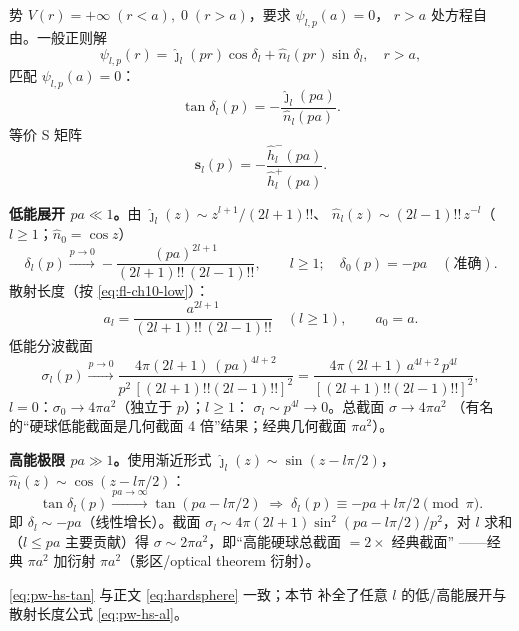 势 $V(r)=+\infty\;(r<a),\;0\;(r>a)$，要求 $\psi_{l,p}(a)=0$，
$r>a$ 处方程自由。一般正则解
\[
\psi_{l,p}(r)=\hat\jmath_l(pr)\cos\delta_l+\hat n_l(pr)\sin\delta_l,
\quad r>a,
\]
匹配 $\psi_{l,p}(a)=0$：
\begin{equation}\label{eq:pw-hs-tan}
\boxed{\;\tan\delta_l(p)=-\frac{\hat\jmath_l(pa)}{\hat n_l(pa)}.\;}
\end{equation}
等价 S 矩阵
\begin{equation}\label{eq:pw-hs-S}
\mathbf s_l(p)=-\frac{\hat h_l^-(pa)}{\hat h_l^+(pa)}.
\end{equation}

\textbf{低能展开 $pa\ll 1$。}由 $\hat\jmath_l(z)\sim z^{l+1}/(2l+1)!!$、
$\hat n_l(z)\sim (2l-1)!!\,z^{-l}$（$l\ge 1$；$\hat n_0=\cos z$）
\begin{equation}\label{eq:pw-hs-low}
\delta_l(p)\xrightarrow{p\to 0}
-\frac{(pa)^{2l+1}}{(2l+1)!!\,(2l-1)!!},\qquad l\ge 1;
\quad
\delta_0(p)= -pa\quad(\text{准确}).
\end{equation}
散射长度（按 \eqref{eq:fl-ch10-low}）：
\begin{equation}\label{eq:pw-hs-al}
a_l=\frac{a^{2l+1}}{(2l+1)!!\,(2l-1)!!}\quad(l\ge 1),\qquad
a_0=a.
\end{equation}
低能分波截面
\[
\sigma_l(p)\xrightarrow{p\to 0}\frac{4\pi(2l+1)\,(pa)^{4l+2}}
   {p^2\,[(2l+1)!!(2l-1)!!]^2}
=\frac{4\pi(2l+1)\,a^{4l+2}\,p^{4l}}{[(2l+1)!!(2l-1)!!]^2},
\]
$l=0$：$\sigma_0\to 4\pi a^2$（独立于 $p$）；$l\ge 1$：
$\sigma_l\sim p^{4l}\to 0$。总截面 $\sigma\to 4\pi a^2$
（有名的“硬球低能截面是几何截面 4 倍”结果；经典几何截面
$\pi a^2$）。

\textbf{高能极限 $pa\gg 1$。}使用渐近形式
$\hat\jmath_l(z)\sim\sin(z-l\pi/2)$，
$\hat n_l(z)\sim\cos(z-l\pi/2)$：
\begin{equation}
\tan\delta_l(p)\xrightarrow{pa\to\infty}\tan(pa-l\pi/2)
\;\Rightarrow\; \delta_l(p)\equiv -pa+l\pi/2\pmod\pi.
\end{equation}
即 $\delta_l\sim -pa$（线性增长）。截面
$\sigma_l\sim 4\pi(2l+1)\sin^2(pa-l\pi/2)/p^2$，对 $l$ 求和
（$l\le pa$ 主要贡献）得
$\sigma\sim 2\pi a^2$，即“高能硬球总截面 $=2\times$ 经典截面”
——经典 $\pi a^2$ 加衍射 $\pi a^2$（影区/optical theorem 衍射）。

\begin{remark}
\eqref{eq:pw-hs-tan} 与正文 \eqref{eq:hardsphere} 一致；本节
补全了任意 $l$ 的低/高能展开与散射长度公式 \eqref{eq:pw-hs-al}。
\end{remark}

